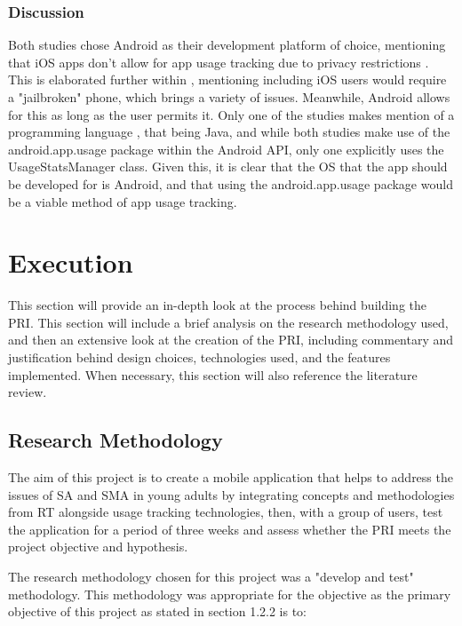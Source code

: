 \documentclass[12pt]{article}
\begin{document}
\subsubsection{Discussion}
Both studies chose Android as their development platform of choice, mentioning that iOS apps don't allow for app 
usage tracking due to privacy restrictions 
\autocite{RefWorks:RefID:118-rosa2022problematic, RefWorks:RefID:116-bye2024cohort, applesupport-ifanappasks}. 
This is elaborated further within \textcite{RefWorks:RefID:123-2024mobile}, mentioning including iOS users 
would require a "jailbroken" phone, which brings a variety of issues. Meanwhile, Android allows for this as 
long as the user permits it. Only one of the studies makes mention of a programming language 
\autocite{RefWorks:RefID:118-rosa2022problematic}, that being Java, and while both studies make use of the
android.app.usage package within the Android API, only one \autocite{RefWorks:RefID:118-rosa2022problematic}
explicitly uses the UsageStatsManager class. Given this, it is clear that the OS that the app 
should be developed for is Android, and that using the android.app.usage package would be a viable method of app 
usage tracking.
\newpage


\section{Execution}
This section will provide an in-depth look at the process behind building the PRI. This section will 
include a brief analysis on the research methodology used, and then an extensive look at the creation of the PRI, including commentary 
and justification behind design choices, technologies used, and the features implemented. When necessary, this
section will also reference the literature review.

\subsection{Research Methodology}
The aim of this project is to create a mobile application that helps to address the issues of SA and SMA in young adults by integrating concepts and methodologies from RT alongside usage 
tracking technologies, then, with a group of users, test the application for a period of three weeks and assess whether the PRI meets the project objective and hypothesis.\newline

The research methodology chosen for this project was a "develop and test" methodology. This methodology was appropriate for the objective as the 
primary objective of this project as stated in section 1.2.2 is to: \newline
\end{document}
